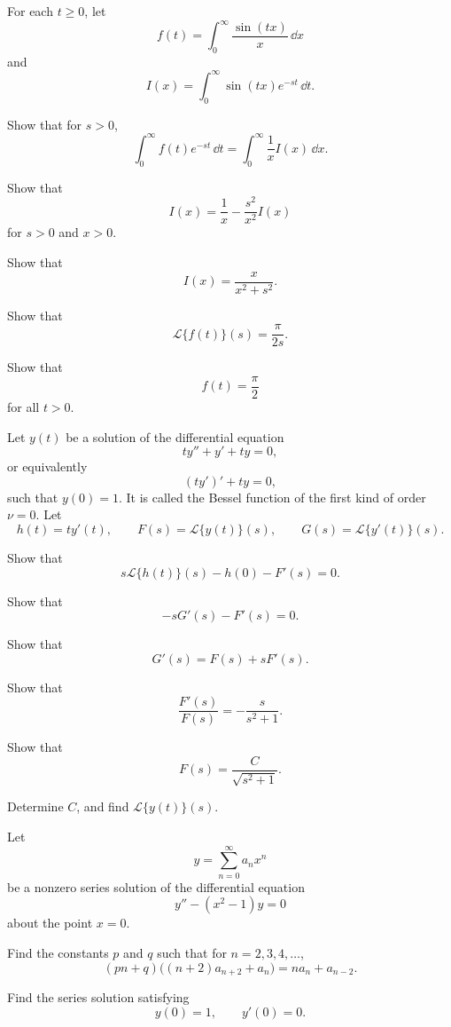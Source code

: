 \documentclass[11pt,oneside]{article}
\begin{document}
\begin{problem}
For each $t\ge0$, let
\[
f(t)=\int_0^\infty \frac{\sin(tx)}{x}\,\dd x
\]
and
\[
I(x)=\int_0^\infty \sin(tx)e^{-st}\,\dd t.
\]
\begin{problemsubparts}
\item Show that for $s>0$,
\[
\int_0^\infty f(t)e^{-st}\,\dd t
=\int_0^\infty \frac{1}{x}I(x)\,\dd x.
\]
\item Show that
\[
I(x)=\frac1x-\frac{s^2}{x^2}I(x)
\]
for $s>0$ and $x>0$.
\item Show that
\[
I(x)=\frac{x}{x^2+s^2}.
\]
\item Show that
\[
\mathcal{L}\{f(t)\}(s)=\frac{\pi}{2s}.
\]
\item Show that
\[
f(t)=\frac{\pi}{2}
\]
for all $t>0$.
\end{problemsubparts}
\end{problem}

\begin{problem}
Let $y(t)$ be a solution of the differential equation
\[
ty''+y'+ty=0,
\]
or equivalently
\[
(ty')'+ty=0,
\]
such that $y(0)=1$. It is called the Bessel function of the first kind of order $\nu=0$. Let
\[
h(t)=ty'(t),
\qquad
F(s)=\mathcal{L}\{y(t)\}(s),
\qquad
G(s)=\mathcal{L}\{y'(t)\}(s).
\]
\begin{problemsubparts}
\item Show that
\[
s\mathcal{L}\{h(t)\}(s)-h(0)-F'(s)=0.
\]
\item Show that
\[
-sG'(s)-F'(s)=0.
\]
\item Show that
\[
G'(s)=F(s)+sF'(s).
\]
\item Show that
\[
\frac{F'(s)}{F(s)}=-\frac{s}{s^2+1}.
\]
\item Show that
\[
F(s)=\frac{C}{\sqrt{s^2+1}}.
\]
\item Determine $C$, and find $\mathcal{L}\{y(t)\}(s)$.
\end{problemsubparts}
\end{problem}

\begin{problem}
Let
\[
y=\sum_{n=0}^{\infty}a_nx^n
\]
be a nonzero series solution of the differential equation
\[
y''-(x^2-1)y=0
\]
about the point $x=0$.
\begin{problemsubparts}
\item Find the constants $p$ and $q$ such that for $n=2,3,4,\dots$,
\[
(pn+q)\bigl((n+2)a_{n+2}+a_n\bigr)=na_n+a_{n-2}.
\]
\item Find the series solution satisfying
\[
y(0)=1,
\qquad
y'(0)=0.
\]
\end{problemsubparts}
\end{problem}
\end{document}
